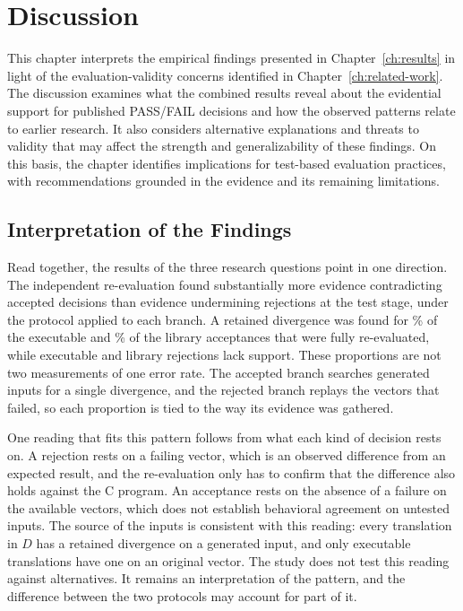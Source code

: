 \chapter{Discussion}\label{ch:discussion}

This chapter interprets the empirical findings presented in Chapter~\ref{ch:results} in light of the evaluation-validity concerns identified in Chapter~\ref{ch:related-work}. The discussion examines what the combined results reveal about the evidential support for published PASS/FAIL decisions and how the observed patterns relate to earlier research. It also considers alternative explanations and threats to validity that may affect the strength and generalizability of these findings. On this basis, the chapter identifies implications for test-based evaluation practices, with recommendations grounded in the evidence and its remaining limitations.

\section{Interpretation of the Findings}\label{sec:d-interpretation}

Read together, the results of the three research questions point in one direction. The independent re-evaluation found substantially more evidence contradicting accepted decisions than evidence undermining rejections at the test stage, under the protocol applied to each branch. A retained divergence was found for \rqFPExeAllPct\% of the executable and \rqFPLibAllPct\% of the library acceptances that were fully re-evaluated, while  executable and  library rejections lack support. These proportions are not two measurements of one error rate. The accepted branch searches generated inputs for a single divergence, and the rejected branch replays the vectors that failed, so each proportion is tied to the way its evidence was gathered.

One reading that fits this pattern follows from what each kind of decision rests on. A rejection rests on a failing vector, which is an observed difference from an expected result, and the re-evaluation only has to confirm that the difference also holds against the C program. An acceptance rests on the absence of a failure on the available vectors, which does not establish behavioral agreement on untested inputs. The source of the inputs is consistent with this reading: every translation in $D$ has a retained divergence on a generated input, and only \rqDivTransLayerSExeAllNum{} executable translations have one on an original vector. The study does not test this reading against alternatives. It remains an interpretation of the pattern, and the difference between the two protocols may account for part of it.

